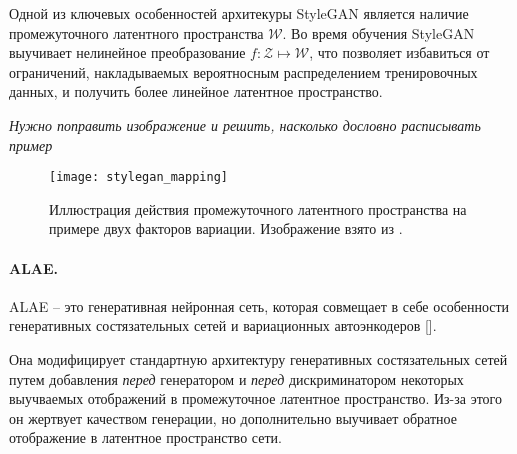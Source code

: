 Одной из ключевых особенностей архитекуры StyleGAN является наличие промежуточного латентного пространства $\mathcal W$. Во время обучения StyleGAN выучивает нелинейное преобразование $f: \mathcal Z \mapsto \mathcal W$, что позволяет избавиться от ограничений, накладываемых вероятносным распределением тренировочных данных, и получить более линейное латентное пространство.

\emph{Нужно поправить изображение и решить, насколько дословно расписывать пример}

\begin{figure}[h]
\begin{center}
    \texttt{[image: stylegan\_mapping]}
    \caption{Иллюстрация действия промежуточного латентного пространства на примере двух факторов вариации. Изображение взято из \cite{StyleGAN}.}
    \label{fig:stylegan-mapping}
\end{center}
\end{figure}


\paragraph{ALAE.}

ALAE \cite{ALAE} – это генеративная нейронная сеть, которая совмещает в себе особенности генеративных состязательных сетей и вариационных автоэнкодеров [].

Она модифицирует стандартную архитектуру генеративных состязательных сетей путем добавления \emph{перед} генератором и \emph{перед} дискриминатором некоторых выучваемых отображений в промежуточное латентное пространство.
Из-за этого он жертвует качеством генерации, но дополнительно выучивает обратное отображение в латентное пространство сети.


